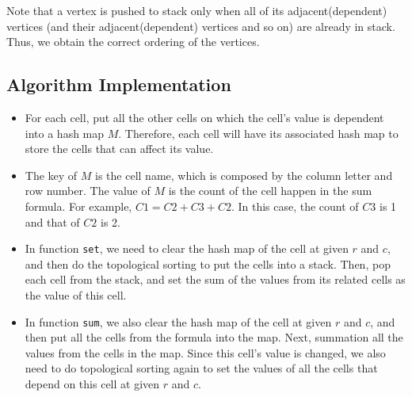 Note that a vertex is pushed to stack only when all of its adjacent(dependent) vertices (and their adjacent(dependent) vertices and so on) are already in stack. Thus, we obtain the correct ordering of the vertices. 

\subsection{Algorithm Implementation}
\begin{itemize}
\item For each cell, put all the other cells on which the cell's value is dependent into a hash map $M$. Therefore, each cell will have its associated hash map to store the cells that can affect its value.
\item The key of $M$ is the cell name, which is composed by the column letter and row number. The value of $M$ is the count of the cell happen in the sum formula. For example, $C1=C2+C3+C2$. In this case, the count of $C3$ is 1 and that of $C2$ is 2.
\item In function \texttt{set}, we need to clear the hash map of the cell at given $r$ and $c$, and then do the topological sorting to put the cells into a stack. Then, pop each cell from the stack, and set the sum of the values from its related cells as the value of this cell.
\item In function \texttt{sum}, we also clear the hash map of the cell at given $r$ and $c$, and then put all the cells from the formula into the map. Next, summation all the values from the cells in the map. Since this cell's value is changed, we also need to do topological sorting again to set the values of all the cells that depend on this cell at given $r$ and $c$.
\
\end{itemize}
